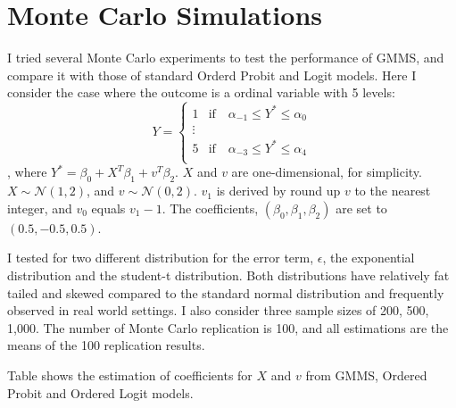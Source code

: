 \documentclass{article}
\begin{document}
\section{Monte Carlo Simulations}
I tried several Monte Carlo experiments to test the performance of GMMS, and compare it with those of standard Orderd Probit and Logit models. Here I consider the case where the outcome is a ordinal variable with 5 levels:
$$
    Y = \begin{cases}
        1 &\text{if}\quad \alpha_{-1} \le Y^\ast \le \alpha_0 \\
        \vdots & \\
        5 &\text{if}\quad \alpha_{-3} \le Y^\ast \le \alpha_4 \\
    \end{cases}
$$ 
, where $Y^{\ast} = \beta_{0} + X^{T} \beta_{1} + v^{T} \beta_{2}$. $X$ and $v$ are one-dimensional, for simplicity. $X \sim \mathcal{N}(1, 2)$, and $v \sim \mathcal{N}(0, 2)$. $v_{1}$ is derived by round up $v$ to the nearest integer, and $v_{0}$ equals $v_{1} - 1$. The coefficients, $(\beta_{0} , \beta_{1}, \beta_{2})$ are set to $(0.5, -0.5, 0.5)$. 

I tested for two different distribution for the error term, $\epsilon$, the exponential distribution and the student-t distribution. Both distributions have relatively fat tailed and skewed compared to the standard normal distribution and frequently observed in real world settings. I also consider three sample sizes of 200, 500, 1,000. The number of
Monte Carlo replication is 100, and all estimations are the means of the 100 replication results. 

Table shows the estimation of coefficients for $X$ and $v$ from GMMS, Ordered Probit and Ordered Logit models.





\end{document}
